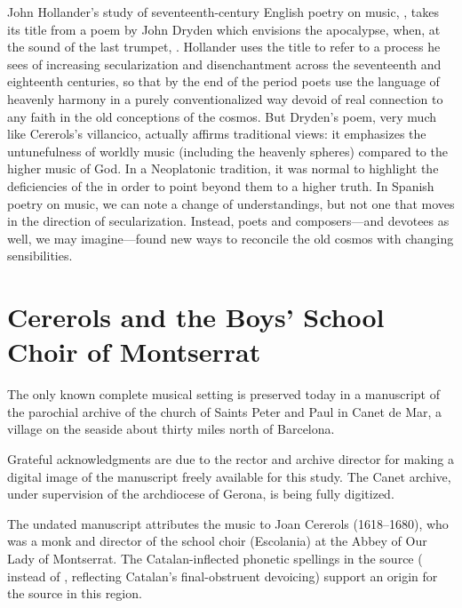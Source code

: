 John Hollander's study of seventeenth-century English poetry on music,
, takes its title from a poem by John Dryden
which envisions the apocalypse, when, at the sound of the last trumpet,
.%
    \Autocites{Hollander:Untuning}{Dryden:Alexander}
Hollander uses the title to refer to a process he sees of increasing
secularization and disenchantment across the seventeenth and eighteenth
centuries, so that by the end of the period poets use the language of heavenly
harmony in a purely conventionalized way devoid of real connection to any faith
in the old conceptions of the cosmos.
But Dryden's poem, very much like Cererols's villancico, actually affirms
traditional views: it emphasizes the untunefulness of worldly music (including
the heavenly spheres) compared to the higher music of God.
In a Neoplatonic tradition, it was normal to highlight the deficiencies of the
 in order to point beyond them to a higher
truth.
In Spanish poetry on music, we can note a change of understandings, but not one
that moves in the direction of secularization.%
    \Autocite{UribeBracho:OrfeoPhD}
Instead, poets and composers---and devotees as well, we may imagine---found new
ways to reconcile the old cosmos with changing sensibilities.

\section{Cererols and the Boys' School Choir of Montserrat}

The only known complete musical setting is preserved today in a manuscript of
the parochial archive of the church of Saints Peter and Paul in Canet de Mar, a
village on the seaside about thirty miles north of Barcelona.%
\begin{Footnote}
    Grateful acknowledgments are due to the rector and archive director for
    making a digital image of the manuscript freely available for this study.
    The Canet archive, under supervision of the archdiocese of Gerona, is being
    fully digitized.
\end{Footnote}
The undated manuscript attributes the music to Joan Cererols (1618--1680), who
was a monk and director of the school choir (Escolania) at the Abbey of Our Lady
of Montserrat.%
    \Autocite{Bonastre:CanetCatalog}
The Catalan-inflected phonetic spellings in the source ( instead
of , reflecting Catalan's final-obstruent devoicing) support an
origin for the source in this region.%
    \Autocite{Myers:CatalanPhonology}

